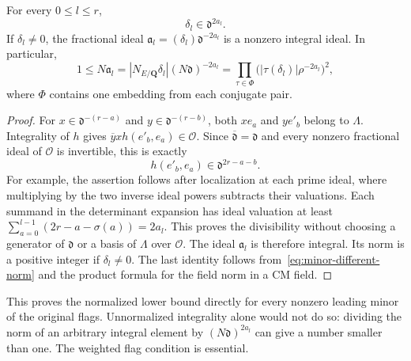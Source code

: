 \begin{theorem}
\label{thm:actual-minor-ideal}
For every $0\le l\le r$,
\[
 \delta_l\in\mathfrak d^{2a_l}.
\]
If $\delta_l\ne0$, the fractional ideal
$\mathfrak a_l=(\delta_l)\mathfrak d^{-2a_l}$ is a nonzero
integral ideal.  In particular,
\begin{equation}\label{eq:actual-minor-product}
 1\le N\mathfrak a_l
   =|N_{E/\mathbf Q}\delta_l|(N\mathfrak d)^{-2a_l}
   =\prod_{\tau\in\Phi}
       \bigl(|\tau(\delta_l)|\rho^{-2a_l}\bigr)^2,
\end{equation}
where $\Phi$ contains one embedding from each conjugate pair.
\end{theorem}

\begin{proof}
For $x\in\mathfrak d^{-(r-a)}$ and
$y\in\mathfrak d^{-(r-b)}$, both $xe_a$ and $ye'_b$ belong
to $\Lambda$.  Integrality of $h$ gives
$\overline y x h(e'_b,e_a)\in\mathcal O$.
Since $\overline{\mathfrak d}=\mathfrak d$ and every nonzero
fractional ideal of $\mathcal O$ is invertible, this is exactly
\[
 h(e'_b,e_a)\in\mathfrak d^{2r-a-b}.
\]
For example, the assertion follows after localization at each prime
ideal, where multiplying by the two inverse ideal powers subtracts
their valuations.  Each summand in the determinant expansion has
ideal valuation at least
$\sum_{a=0}^{l-1}(2r-a-\sigma(a))=2a_l$.
This proves the divisibility without choosing a generator of
$\mathfrak d$ or a basis of $\Lambda$ over $\mathcal O$.
The ideal $\mathfrak a_l$ is therefore integral.  Its norm is a
positive integer if $\delta_l\ne0$.  The last identity follows
from~\eqref{eq:minor-different-norm} and the product formula for
the field norm in a CM field.
\end{proof}

This proves the normalized lower bound directly for every nonzero
leading minor of the original flags.  Unnormalized integrality
alone would not do so: dividing the norm of an arbitrary integral
element by $(N\mathfrak d)^{2a_l}$ can give a number smaller than
one.  The weighted flag condition is essential.

